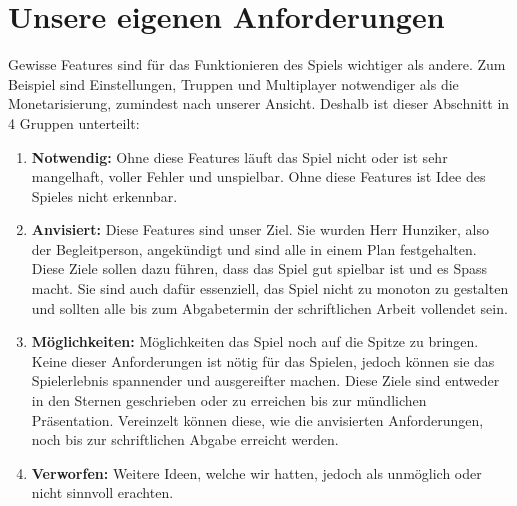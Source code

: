 \section {Unsere eigenen Anforderungen}
Gewisse Features sind für das Funktionieren des Spiels wichtiger als andere.
Zum Beispiel sind Einstellungen, Truppen und Multiplayer notwendiger als die Monetarisierung, zumindest nach unserer Ansicht.
Deshalb ist dieser Abschnitt in 4 Gruppen unterteilt:
\begin{enumerate}
    \item \textbf{Notwendig:}
        Ohne diese Features läuft das Spiel nicht oder ist sehr mangelhaft,
        voller Fehler und unspielbar. Ohne diese Features ist Idee des Spieles nicht erkennbar.
    \item \textbf{Anvisiert:}
        Diese Features sind unser Ziel. Sie wurden Herr Hunziker, also der Begleitperson, angekündigt und sind alle in einem Plan festgehalten.
        Diese Ziele sollen dazu führen, dass das Spiel
        gut spielbar ist und es Spass macht. Sie sind auch dafür essenziell, das Spiel nicht zu monoton zu gestalten und sollten
        alle bis zum Abgabetermin der schriftlichen Arbeit vollendet sein.
    \item \textbf{Möglichkeiten:}
        Möglichkeiten das Spiel noch auf die Spitze zu bringen. Keine dieser Anforderungen ist nötig
        für das Spielen, jedoch können sie das Spielerlebnis spannender und ausgereifter machen. Diese
        Ziele sind entweder in den Sternen geschrieben oder zu erreichen bis zur mündlichen Präsentation.
        Vereinzelt können diese, wie die anvisierten Anforderungen, noch bis zur schriftlichen Abgabe erreicht werden.
    \item \textbf{Verworfen:}
        Weitere Ideen, welche wir hatten, jedoch als unmöglich oder nicht sinnvoll erachten.
\end{enumerate}

